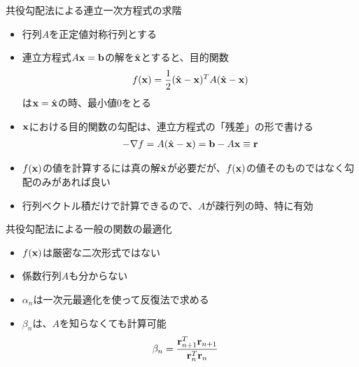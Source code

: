 \begin{frame}[t,fragile]{共役勾配法による連立一次方程式の求階}
  \begin{itemize}
  \item 行列$A$を正定値対称行列とする
  \item 連立方程式$A{\bf x}={\bf b}$の解を$\hat{\bf x}$とすると、目的関数
    \begin{align*}
      f({\bf x}) = \frac{1}{2} (\hat{\bf x} - {\bf x})^T A (\hat{\bf x} - {\bf x})
    \end{align*}
    は${\bf x} = \hat{\bf x}$の時、最小値0をとる
  \item ${\bf x}$における目的関数の勾配は、連立方程式の「残差」の形で書ける
    \begin{align*}
      -\nabla f = A (\hat{\bf x} - {\bf x}) = {\bf b} - A {\bf x} \equiv {\bf r}
    \end{align*}
  \item $f({\bf x})$の値を計算するには真の解$\hat{\bf x}$が必要だが、$f({\bf x})$の値そのものではなく勾配のみがあれば良い
  \item 行列ベクトル積だけで計算できるので、$A$が疎行列の時、特に有効
  \end{itemize}
\end{frame}

\begin{frame}[t,fragile]{共役勾配法による一般の関数の最適化}
  \begin{itemize}
    \setlength{\itemsep}{1em}
  \item $f({\bf x})$は厳密な二次形式ではない
  \item 係数行列$A$も分からない
  \item $\alpha_n$は一次元最適化を使って反復法で求める
  \item $\beta_n$は、$A$を知らなくても計算可能
    \begin{align*}
      \beta_n &= \frac{{\bf r}_{n+1}^T {\bf r}_{n+1}}{{\bf r}_n^T {\bf r}_n}
    \end{align*}
  \end{itemize}
\end{frame}
